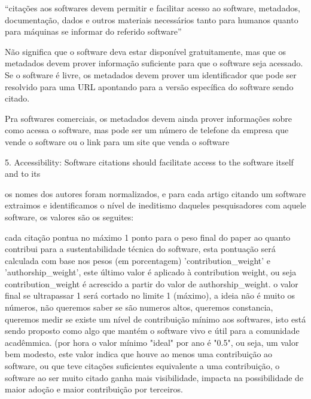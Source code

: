 ``citações aos softwares devem permitir e facilitar acesso ao software,
metadados, documentação, dados e outros materiais necessários tanto
para humanos quanto para máquinas se informar do referido software''

Não significa que o software deva estar disponível gratuitamente, mas que
os metadados devem prover informação suficiente para que o software seja
acessado. Se o software é livre, os metadados devem prover um identificador
que pode ser resolvido para uma URL apontando para a versão específica
do software sendo citado.

Pra softwares comerciais, os metadados devem ainda prover informações sobre
como acessa o software, mas pode ser um número de telefone da empresa que
vende o software ou o link para um site que venda o software

\cite{smith2016software}

5. Accessibility: Software citations should facilitate access to the software itself and to its

os nomes dos autores foram normalizados,
e para cada artigo citando um software extraimos e identificamos o nível
de ineditismo daqueles pesquisadores com aquele software, os valores
são os seguites:

% 

cada citação pontua no máximo 1 ponto para o peso final do paper ao quanto
contribui para a sustentabilidade técnica do software, esta pontuação será
calculada com base nos pesos (em porcentagem) 'contribution\_weight' e
'authorship\_weight', este último valor é aplicado à contribution weight,
ou seja contribution\_weight é acrescido a partir do valor de authorship\_weight.
o valor final se ultrapassar 1 será cortado no limite 1 (máximo), a ideia não é muito
os números, não queremos saber se são numeros altos, queremos constancia, queremos
medir se existe um nível de contribuição mínimo aos softwares, isto está
sendo proposto como algo que mantém o software vivo e útil para a comunidade
acadêmmica. (por hora o valor mínimo "ideal" por ano é "0.5", ou seja, um
valor bem modesto, este valor indica que houve ao menos uma contribuição
ao software, ou que teve citações suficientes equivalente a uma contribuição,
o software ao ser muito citado ganha mais visibilidade, impacta na possibilidade
de maior adoção e maior contribuição por terceiros.

